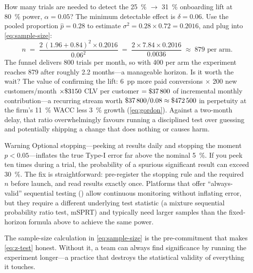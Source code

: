 \begin{example}
How many trials are needed to detect the \qty{25}{\percent} \(\to\) \qty{31}{\percent}
onboarding lift at \qty{80}{\percent} power, \(\alpha=0.05\)? The minimum detectable effect
is \(\delta=0.06\). Use the pooled proportion \(\hat{p}=0.28\) to estimate
\(\sigma^2 = 0.28\times 0.72 = 0.2016\), and plug into \cref{eq:sample-size}:
\[
  n \;=\; \frac{2\,(1.96+0.84)^{2}\times 0.2016}{0.06^{2}}
      \;=\; \frac{2\times 7.84 \times 0.2016}{0.0036}
      \;\approx\; \num{879} \text{ per arm}.
\]
The funnel delivers \num{800} trials per month, so with \num{400} per arm the experiment
reaches \num{879} after roughly \num{2.2} months---a manageable horizon. Is it worth the
wait? The value of confirming the lift: \qty{6}{pp} more paid conversions \(\times\) \num{200}
new customers/month \(\times \$\num{3150}\) CLV per customer \(= \$\num{37800}\) of incremental
monthly contribution---a recurring stream worth \(\$\num{37800}/0.08 \approx \$\num{472500}\)
in perpetuity at the firm's \qty{11}{\percent} WACC less \qty{3}{\percent} growth
(\cref{eq:gordon}). Against a two-month delay, that ratio overwhelmingly favours running a
disciplined test over guessing and potentially shipping a change that does nothing or causes
harm.
\end{example}

\begin{admonition}{Warning}
Optional stopping---peeking at results daily and stopping the moment \(p<0.05\)---inflates
the true Type-I error far above the nominal \qty{5}{\percent}. If you peek ten times during
a trial, the probability of a spurious significant result can exceed \qty{30}{\percent}. The
fix is straightforward: pre-register the stopping rule and the required \(n\) before launch,
and read results exactly once. Platforms that offer ``always-valid'' sequential testing
(\textcite{johari2022always}) allow continuous monitoring without inflating error, but they
require a different underlying test statistic (a mixture sequential probability ratio test,
mSPRT) and typically need larger samples than the fixed-horizon formula above to achieve
the same power.
\end{admonition}

The sample-size calculation in \cref{eq:sample-size} is the pre-commitment that makes
\cref{eq:z-test} honest. Without it, a team can always find significance by running the
experiment longer---a practice that destroys the statistical validity of everything it
touches.


